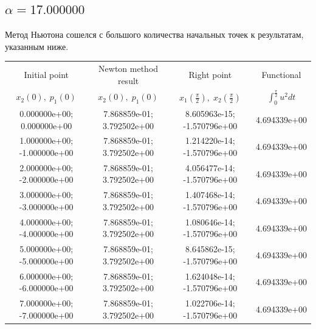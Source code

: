 \documentclass[titlepage]{article}
\def\l{\left}
\def\r{\right}
\begin{document}
\subsection{$\alpha = 17.000000$} 
Метод Ньютона сошелся с большого количества начальных точек к результатам, указанным ниже. \\ 
\begin{tabular}{ | c | c | c | c |} 
\hline 
Initial point  & Newton method result & Right point & Functional 
 \\ $x_2(0), \; p_1(0)$ & $x_2(0), \; p_1(0)$ & $x_1\l(\frac{\pi}{2}\r), \; x_2\l(\frac{\pi}{2}\r)$ & $\int_{0}^{\frac{\pi}{2}}u^2dt$  \\ \hline 
0.000000e+00; 0.000000e+00 & 7.868859e-01; 3.792502e+00 & 8.605963e-15; -1.570796e+00 & 4.694339e+00 \\ \hline 
1.000000e+00; -1.000000e+00 & 7.868859e-01; 3.792502e+00 & 1.214220e-14; -1.570796e+00 & 4.694339e+00 \\ \hline 
2.000000e+00; -2.000000e+00 & 7.868859e-01; 3.792502e+00 & 4.056477e-14; -1.570796e+00 & 4.694339e+00 \\ \hline 
3.000000e+00; -3.000000e+00 & 7.868859e-01; 3.792502e+00 & 1.407468e-14; -1.570796e+00 & 4.694339e+00 \\ \hline 
4.000000e+00; -4.000000e+00 & 7.868859e-01; 3.792502e+00 & 1.080646e-14; -1.570796e+00 & 4.694339e+00 \\ \hline 
5.000000e+00; -5.000000e+00 & 7.868859e-01; 3.792502e+00 & 8.645862e-15; -1.570796e+00 & 4.694339e+00 \\ \hline 
6.000000e+00; -6.000000e+00 & 7.868859e-01; 3.792502e+00 & 1.624048e-14; -1.570796e+00 & 4.694339e+00 \\ \hline 
7.000000e+00; -7.000000e+00 & 7.868859e-01; 3.792502e+00 & 1.022706e-14; -1.570796e+00 & 4.694339e+00 \\ \hline 
\end{tabular} 
\end{document}
